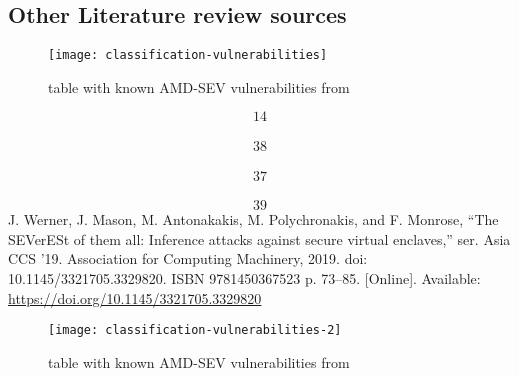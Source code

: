 \subsection{Other Literature review sources}

\begin{figure}[!ht]
    \centering
    \texttt{[image: classification-vulnerabilities]}
    \caption{table with known AMD-SEV vulnerabilities  
    from \cite{leijonberg_viability_2021}}
    \label{fig:classification-vulnerabilities}
\end{figure}



\[14\]  \cite{buhren_insecure_2019}\\
\[38\]  \cite{li_exploiting_2019}\\
\[37\]  \cite{li_exploiting_2019}\\
\[39\]  J. Werner, J. Mason, M. Antonakakis, M. Polychronakis, and F. Monrose, “The SEVerESt of them all: Inference attacks against secure virtual enclaves,” ser. Asia CCS ’19. Association for Computing Machinery, 2019. 
doi: 10.1145/3321705.3329820. 
ISBN 9781450367523 p. 73–85. [Online]. 
Available: \url{https://doi.org/10.1145/3321705.3329820}

\begin{figure}[!ht]
    \centering
    \texttt{[image: classification-vulnerabilities-2]}
    \caption{table with known AMD-SEV vulnerabilities  
    from \cite{li_crossline_2021}}
    \label{fig:classification-vulnerabilities-2}
\end{figure}

\newpage
\newpage

\newpage

\newpage
\newpage

\newpage

\newpage
\newpage
\newpage
\newpage
\newpage
\newpage
\newpage
